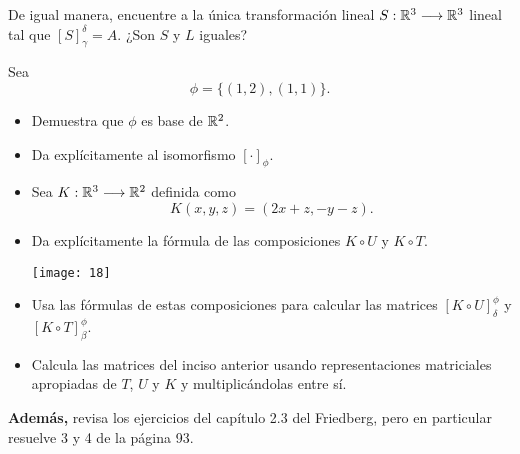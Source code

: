 \begin{enumerate}
	De igual manera, encuentre a la única transformación lineal
	$S: \mathbb{R}^{3} \longrightarrow \mathbb{R}^{3}$ lineal tal que 
	$[S]_{\gamma}^{\delta} = A$. ¿Son $S$ y $L$ iguales?	
\end{enumerate}

Sea 
\begin{equation}
	\label{eq: ejercicio 4 phi}
	\phi = \{ (1, 2), (1, 1) \}.
\end{equation}
\begin{itemize}
	\item Demuestra que $\phi$ es base de $\mathbb{R}^{2}$.
	\item Da explícitamente al isomorfismo 
	$[\cdot]_{\phi}$.
	\item Sea $K : \mathbb{R}^{3} \longrightarrow \mathbb{R}^{2}$
	definida como
	\[
	K(x, y, z) = (2x+z, -y - z).
	\]
	\item Da explícitamente la fórmula de las composiciones
	$K\circ U$ y $K \circ T$.
	\begin{marginfigure}
	\texttt{[image: 18]} 
	\end{marginfigure}
	\item Usa las fórmulas de estas composiciones para calcular
	las matrices $[K \circ U]_{\delta}^{\phi}$ y 
	$[K \circ T]_{\beta}^{\phi}$.
	\item Calcula las matrices del inciso anterior usando
	representaciones matriciales apropiadas de $T$, $U$ y $K$
	y multiplicándolas entre sí.
\end{itemize}

\textbf{Además,} revisa los ejercicios del capítulo 2.3 del Friedberg,
pero en particular resuelve
3 y 4 de la página 93.
\newpage